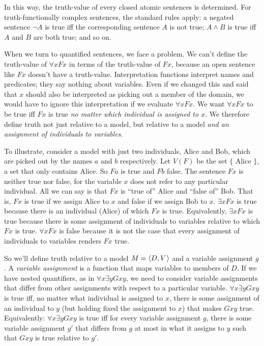 In this way, the truth-value of every closed atomic sentences is determined. For
truth-functionally complex sentences, the standard rules apply: a negated
sentence $\neg A$ is true iff the corresponding sentence $A$ is not true;
$A \land B$ is true iff $A$ and $B$ are both true; and so on.

When we turn to quantified sentences, we face a problem. We can't define the
truth-value of $\forall x Fx$ in terms of the truth-value of $Fx$, because an
open sentence like $Fx$ doesn't have a truth-value. Interpretation functions
interpret names and predicates; they say nothing about variables. Even if we
changed this and said that $x$ should also be interpreted as picking out a
member of the domain, we would have to ignore this interpretation if we
evaluate $\forall x Fx$. We want $\forall x Fx$ to be true iff $Fx$ is true
\emph{no matter which individual is assigned to $x$}. We therefore define truth
not just relative to a model, but relative to a model \emph{and an assignment of
  individuals to variables}.

To illustrate, consider a model with just two individuals, Alice and Bob, which
are picked out by the names $a$ and $b$ respectively. Let $V(F)$ be the set $\{$
Alice $\}$, a set that only contains Alice. So $Fa$ is true and $Fb$ false. The
sentence $Fx$ is neither true nor false, for the variable $x$ does not refer to
any particular individual. All we can say is that $Fx$ is ``true of'' Alice and
``false of'' Bob. That is, $Fx$ is true if we assign Alice to $x$ and false if
we assign Bob to $x$. $\exists x Fx$ is true because there is an individual
(Alice) of which $Fx$ is true. Equivalently, $\exists x Fx$ is true because
there is some assignment of individuals to variables relative to which $Fx$ is
true. $\forall x Fx$ is false because it is not the case that every assignment
of individuals to variables renders $Fx$ true.

So we'll define truth relative to a model $M = \t{D,V}$ and a variable
assignment $g$. A \emph{variable assignment} is a function that maps variables
to members of $D$. If we have nested quantifiers, as in
$\forall x \exists y Gxy$, we need to consider variable assignments that differ
from other assignments with respect to a particular variable.
$\forall x \exists y Gxy$ is true iff, no matter what individual is assigned to
$x$, there is some assignment of an individual to $y$ (but holding fixed the
assignment to $x$) that makes $Gxy$ true. Equivalently: $\forall x\exists y Gxy$
is true iff for every variable assignment $g$, there is some variable assignment
$g'$ that differs from $g$ at most in what it assigns to $y$ such that $Gxy$ is
true relative to $g'$.

